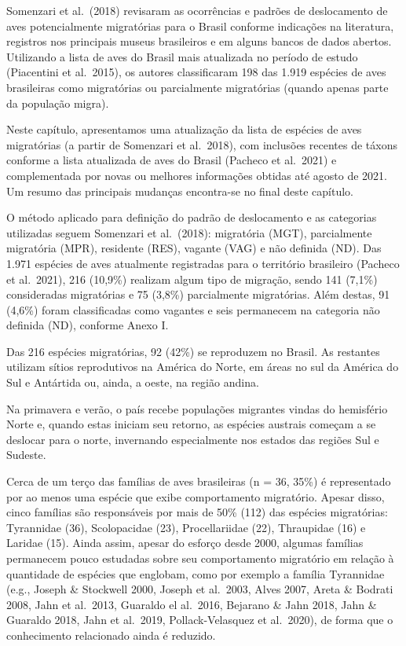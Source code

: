 \documentclass[
  oneside]{scrbook}
\begin{document}
Somenzari et al.~(2018) revisaram as ocorrências e padrões de deslocamento de aves potencialmente migratórias para o Brasil conforme indicações na literatura, registros nos principais museus brasileiros e em alguns bancos de dados abertos. Utilizando a lista de aves do Brasil mais atualizada no período de estudo (Piacentini et al.~2015), os autores classificaram 198 das 1.919 espécies de aves brasileiras como migratórias ou parcialmente migratórias (quando apenas parte da população migra).

Neste capítulo, apresentamos uma atualização da lista de espécies de aves migratórias (a partir de Somenzari et al.~2018), com inclusões recentes de táxons conforme a lista atualizada de aves do Brasil (Pacheco et al.~2021) e complementada por novas ou melhores informações obtidas até agosto de 2021. Um resumo das principais mudanças encontra-se no final deste capítulo.

O método aplicado para definição do padrão de deslocamento e as categorias utilizadas seguem Somenzari et al.~(2018): migratória (MGT), parcialmente migratória (MPR), residente (RES), vagante (VAG) e não definida (ND). Das 1.971 espécies de aves atualmente registradas para o território brasileiro (Pacheco et al.~2021), 216 (10,9\%) realizam algum tipo de migração, sendo 141 (7,1\%) consideradas migratórias e 75 (3,8\%) parcialmente migratórias. Além destas, 91 (4,6\%) foram classificadas como vagantes e seis permanecem na categoria não definida (ND), conforme Anexo I.

Das 216 espécies migratórias, 92 (42\%) se reproduzem no Brasil. As restantes utilizam sítios reprodutivos na América do Norte, em áreas no sul da América do Sul e Antártida ou, ainda, a oeste, na região andina.

Na primavera e verão, o país recebe populações migrantes vindas do hemisfério Norte e, quando estas iniciam seu retorno, as espécies austrais começam a se deslocar para o norte, invernando especialmente nos estados das regiões Sul e Sudeste.

Cerca de um terço das famílias de aves brasileiras (n = 36, 35\%) é representado por ao menos uma espécie que exibe comportamento migratório. Apesar disso, cinco famílias são responsáveis por mais de 50\% (112) das espécies migratórias: Tyrannidae (36), Scolopacidae (23), Procellariidae (22), Thraupidae (16) e Laridae (15). Ainda assim, apesar do esforço desde 2000, algumas famílias permanecem pouco estudadas sobre seu comportamento migratório em relação à quantidade de espécies que englobam, como por exemplo a família Tyrannidae (e.g., Joseph \& Stockwell 2000, Joseph et al.~2003, Alves 2007, Areta \& Bodrati 2008, Jahn et al.~2013, Guaraldo el al.~2016, Bejarano \& Jahn 2018, Jahn \& Guaraldo 2018, Jahn et al.~2019, Pollack-Velasquez et al.~2020), de forma que o conhecimento relacionado ainda é reduzido.
\end{document}
